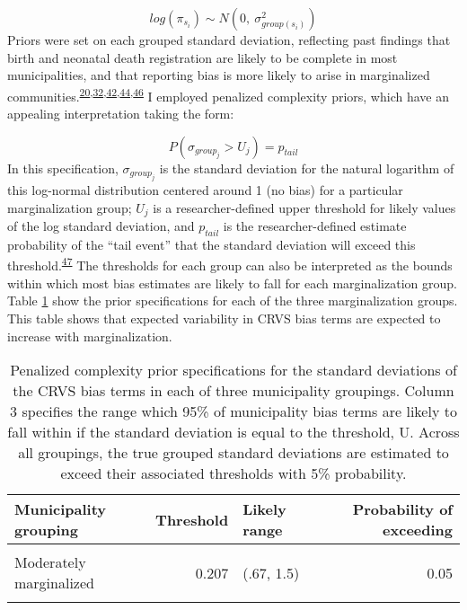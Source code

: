 \documentclass[
]{article}
\begin{document}
\[log(\pi_{s_i}) \sim N(0,~\sigma^2_{group(s_i)})\]
Priors were set on each grouped standard deviation, reflecting past findings that birth and neonatal death registration are likely to be complete in most municipalities, and that reporting bias is more likely to arise in marginalized communities.\textsuperscript{\protect\hyperlink{ref-Dicker2018}{20},\protect\hyperlink{ref-Hernandez2012}{32},\protect\hyperlink{ref-Enciso2017}{42},\protect\hyperlink{ref-Gamlin2020}{44},\protect\hyperlink{ref-Luis2014}{46}} I employed penalized complexity priors, which have an appealing interpretation taking the form:

\[P(\sigma_{group_j} > U_j) = p_{tail}\]
In this specification, \(\sigma_{group_j}\) is the standard deviation for the natural logarithm of this log-normal distribution centered around 1 (no bias) for a particular marginalization group; \(U_j\) is a researcher-defined upper threshold for likely values of the log standard deviation, and \(p_{tail}\) is the researcher-defined estimate probability of the ``tail event'' that the standard deviation will exceed this threshold.\textsuperscript{\protect\hyperlink{ref-Simpson2017}{47}} The thresholds for each group can also be interpreted as the bounds within which most bias estimates are likely to fall for each marginalization group. Table \ref{tab:priors} show the prior specifications for each of the three marginalization groups. This table shows that expected variability in CRVS bias terms are expected to increase with marginalization.

\begin{table}[!h]

\caption{\label{tab:priors}Penalized complexity prior specifications for the standard deviations of the CRVS bias terms in each of three municipality groupings. Column 3 specifies the range which 95\% of municipality bias terms are likely to fall within if the standard deviation is equal to the threshold, U. Across all groupings, the true grouped standard deviations are estimated to exceed their associated thresholds with 5\% probability.}
\centering
\begin{tabular}[t]{lrlr}
\toprule
Municipality grouping & Threshold & Likely range & Probability of exceeding\\
\midrule
\cellcolor{gray!6}{Less marginalized} & \cellcolor{gray!6}{0.048} & \cellcolor{gray!6}{(.91, 1.1)} & \cellcolor{gray!6}{0.05}\\
Moderately marginalized & 0.207 & (.67, 1.5) & 0.05\\
\cellcolor{gray!6}{Most marginalized} & \cellcolor{gray!6}{0.821} & \cellcolor{gray!6}{(.2, 5)} & \cellcolor{gray!6}{0.05}\\
\bottomrule
\end{tabular}
\end{table}
\end{document}
